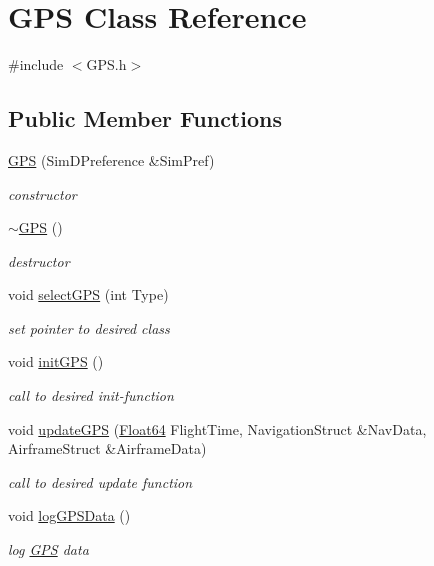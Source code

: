 \hypertarget{class_g_p_s}{}\section{G\+PS Class Reference}
\label{class_g_p_s}


{\ttfamily \#include $<$G\+P\+S.\+h$>$}

\subsection*{Public Member Functions}
\begin{DoxyCompactItemize}
\item 
\hyperlink{class_g_p_s_a534c0227b2c8af802aa9ef100a123210}{G\+PS} (Sim\+D\+Preference \&Sim\+Pref)
\begin{DoxyCompactList}\small\item\em constructor \end{DoxyCompactList}\item 
\hyperlink{class_g_p_s_afe84b00ea93254fcb8b84a0f2b240c9d}{$\sim$\+G\+PS} ()
\begin{DoxyCompactList}\small\item\em destructor \end{DoxyCompactList}\item 
void \hyperlink{class_g_p_s_a0c87197e52afcfd706407ef06e099f00}{select\+G\+PS} (int Type)
\begin{DoxyCompactList}\small\item\em set pointer to desired class \end{DoxyCompactList}\item 
void \hyperlink{class_g_p_s_a0775b2666962335df5945d3d9b1a3188}{init\+G\+PS} ()
\begin{DoxyCompactList}\small\item\em call to desired init-\/function \end{DoxyCompactList}\item 
void \hyperlink{class_g_p_s_ab3ea1d6efb41681aa8d29bd088c80628}{update\+G\+PS} (\hyperlink{group___tools_ga3f1431cb9f76da10f59246d1d743dc2c}{Float64} Flight\+Time, Navigation\+Struct \&Nav\+Data, Airframe\+Struct \&Airframe\+Data)
\begin{DoxyCompactList}\small\item\em call to desired update function \end{DoxyCompactList}\item 
void \hyperlink{class_g_p_s_a36cf39646fc821e0061b010543625e2f}{log\+G\+P\+S\+Data} ()
\begin{DoxyCompactList}\small\item\em log \hyperlink{class_g_p_s}{G\+PS} data \end{DoxyCompactList}\end{DoxyCompactItemize}


